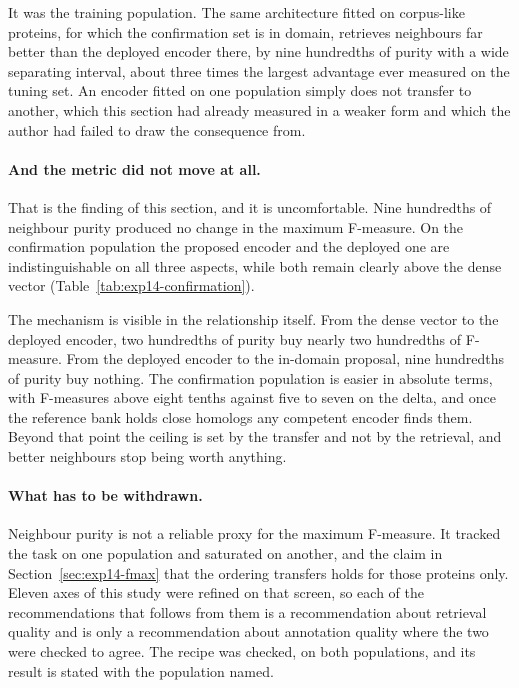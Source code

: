 It was the training population. The same architecture fitted on corpus-like proteins,
for which the confirmation set is in domain, retrieves neighbours far better than the
deployed encoder there, by nine hundredths of purity with a wide separating interval,
about three times the largest advantage ever measured on the tuning set. An encoder
fitted on one population simply does not transfer to another, which this section had
already measured in a weaker form and which the author had failed to draw the
consequence from.

\paragraph{And the metric did not move at all.} That is the finding of this section,
and it is uncomfortable. Nine hundredths of neighbour purity produced no change in the
maximum F-measure. On the confirmation population the proposed encoder and the
deployed one are indistinguishable on all three aspects, while both remain clearly
above the dense vector (Table~\ref{tab:exp14-confirmation}).

\begin{table}[htbp]
  \centering
  \caption{Maximum F-measure on two populations: the evaluation delta this section
  was developed on, and a confirmation set drawn from the general corpus that no arm
  had seen. Intervals are paired bootstrap draws with the measure recomputed on each.}
  \label{tab:exp14-confirmation}
  
\end{table}

The mechanism is visible in the relationship itself. From the dense vector to the
deployed encoder, two hundredths of purity buy nearly two hundredths of F-measure. From
the deployed encoder to the in-domain proposal, nine hundredths of purity buy nothing.
The confirmation population is easier in absolute terms, with F-measures above eight
tenths against five to seven on the delta, and once the reference bank holds close
homologs any competent encoder finds them. Beyond that point the ceiling is set by the
transfer and not by the retrieval, and better neighbours stop being worth anything.

\paragraph{What has to be withdrawn.} Neighbour purity is not a reliable proxy for the
maximum F-measure. It tracked the task on one population and saturated on another, and
the claim in Section~\ref{sec:exp14-fmax} that the ordering transfers holds for those
proteins only. Eleven axes of this study were refined on that screen, so each of the
recommendations that follows from them is a recommendation about retrieval quality and
is only a recommendation about annotation quality where the two were checked to agree.
The recipe was checked, on both populations, and its result is stated with the
population named.


